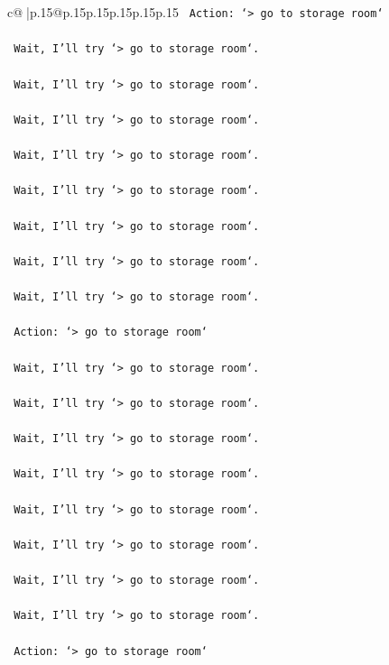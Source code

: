 \documentclass{article}
\begin{document}
{\begin{supertabular}{c@{$\;$}|p{.15\linewidth}@{}p{.15\linewidth}p{.15\linewidth}p{.15\linewidth}p{.15\linewidth}p{.15\linewidth}}
{{{\texttt{    Action: `> go to storage room`} \\
\\ 
\texttt{    Wait, I'll try `> go to storage room`.} \\
\\ 
\texttt{    Wait, I'll try `> go to storage room`.} \\
\\ 
\texttt{    Wait, I'll try `> go to storage room`.} \\
\\ 
\texttt{    Wait, I'll try `> go to storage room`.} \\
\\ 
\texttt{    Wait, I'll try `> go to storage room`.} \\
\\ 
\texttt{    Wait, I'll try `> go to storage room`.} \\
\\ 
\texttt{    Wait, I'll try `> go to storage room`.} \\
\\ 
\texttt{    Wait, I'll try `> go to storage room`.} \\
\\ 
\texttt{    Action: `> go to storage room`} \\
\\ 
\texttt{    Wait, I'll try `> go to storage room`.} \\
\\ 
\texttt{    Wait, I'll try `> go to storage room`.} \\
\\ 
\texttt{    Wait, I'll try `> go to storage room`.} \\
\\ 
\texttt{    Wait, I'll try `> go to storage room`.} \\
\\ 
\texttt{    Wait, I'll try `> go to storage room`.} \\
\\ 
\texttt{    Wait, I'll try `> go to storage room`.} \\
\\ 
\texttt{    Wait, I'll try `> go to storage room`.} \\
\\ 
\texttt{    Wait, I'll try `> go to storage room`.} \\
\\ 
\texttt{    Action: `> go to storage room`} \\
\\ 
}}}
\end{supertabular}}
\end{document}
